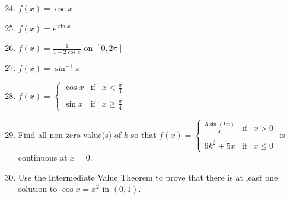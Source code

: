 \documentclass[12pt]{article}
\newif\ifans
\begin{document}
\begin{enumerate}
\setcounter{enumi}{23}

\item $f(x) = \csc{x}$ 

\ifans{\fbox{$f(x)$ is continuous for all $x \neq \pi k$, where $k$ is any integer.}} \fi

\item $f(x) = e^{\sin {x}}$

\ifans{\fbox{$f(x)$ is always continuous.}} \fi

\item $\displaystyle f(x) = \frac{1}{1-2\cos{x}}$ on $[0,2\pi]$ 

\ifans{\fbox{$f(x)$ is continuous for all $x$ in $[0,2\pi]$ except for $\displaystyle x=\frac{\pi}{3}$ and $\displaystyle x=\frac{5\pi}{3}$}} \fi

\item $f(x) = \sin^{-1}{x}$ 

\ifans{\fbox{$f(x)$ is continuous on its domain of $[-1,1]$}} \fi

\item $\displaystyle f(x)=\left\{
\begin{array}{lll}
\cos{x} & \text{if} & x< \frac{\pi}{4}\\
&\\
\sin{x} & \text{if} & x\geq \frac{\pi}{4}
\end{array}\right.$

\ifans{\fbox{$f(x)$ is always continuous.}} \fi

\item Find all non-zero value(s) of $k$ so that $\displaystyle f(x)=\left\{\begin{array}{lll}
\frac{3\sin{(kx)}}{x} & \text{if} & x>0\\
&&\\
6k^2+5x & \text{if} & x \leq 0
\end{array}\right.$
is continuous at $x=0$.

\ifans{\fbox{$\displaystyle k=\frac{1}{2}$}} \fi

\item Use the Intermediate Value Theorem to prove that there is at least one solution to $\cos{x}=x^2$ in $(0,1)$.

\ifans{\fbox{\parbox{1\linewidth}{Let $f(x)=\cos{(x)}-x^2$.  Since $f(x)$ is continuous on $(-\infty,\infty)$, it is also continuous on $[0,1]$.  Notice that $f(0)=1>0$ and $f(1)=\cos{(1)}-1<0$.  Thus, the Intermediate Value Theorem states that there must be some $c$ in $(0,1)$ such that $f(c)=0$.  i.e., there must be at least one $c$ in $(0,1)$ such that $\cos(c)-c^2=0$ $\implies$ $\cos{(c)}=c^2$, as desired.}}} \fi


\end{enumerate}
\end{document}
